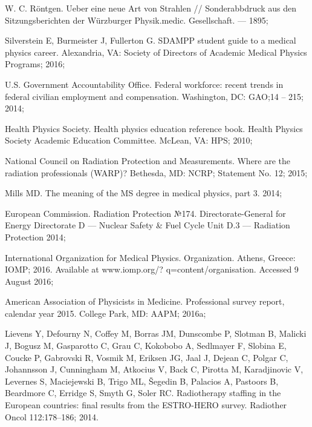 \documentclass[a4paper,10pt]{extarticle}
\begin{document}
\begin{thebibliography}{99} %

W. C. Röntgen. Ueber eine neue Art von Strahlen // Sonderabbdruck aus den Sitzungsberichten der Würzburger Physik.medic. Gesellschaft. — 1895;

Silverstein E, Burmeister J, Fullerton G. SDAMPP student guide to a medical physics career. Alexandria, VA: Society of Directors of Academic Medical Physics Programs; 2016;

U.S. Government Accountability Office. Federal workforce: recent trends in federal civilian employment and compensation. Washington, DC: GAO;14 -- 215; 2014;

Health Physics Society. Health physics education reference book. Health Physics Society Academic Education Committee. McLean, VA: HPS; 2010;

National Council on Radiation Protection and Measurements. Where are the radiation professionals (WARP)? Bethesda, MD: NCRP; Statement No. 12; 2015;

Mills MD. The meaning of the MS degree in medical physics, part 3. 2014;

European Commission. Radiation Protection №174. Directorate-General for Energy Directorate D — Nuclear Safety \& Fuel Cycle Unit D.3 — Radiation Protection
2014;

International Organization for Medical Physics. Organization. Athens, Greece: IOMP; 2016. Available at www.iomp.org/? q=content/organisation. Accessed 9 August 2016;

American Association of Physicists in Medicine. Professional survey report, calendar year 2015. College Park, MD: AAPM; 2016a;

Lievens Y, Defourny N, Coffey M, Borras JM, Dunscombe P, Slotman B, Malicki J, Bogusz M, Gasparotto C, Grau C, Kokobobo A, Sedlmayer F, Slobina E, Coucke P, Gabrovski R, Vosmik M, Eriksen JG, Jaal J, Dejean C, Polgar C, Johannsson J, Cunningham M, Atkocius V, Back C, Pirotta M, Karadjinovic V, Levernes S, Maciejewski B, Trigo ML, Šegedin B, Palacios A, Pastoors B, Beardmore C, Erridge S, Smyth G, Soler RC. Radiotherapy staffing in the European countries: final results from the ESTRO-HERO survey. Radiother Oncol 112:178–186; 2014.



\end{thebibliography}
\end{document}
